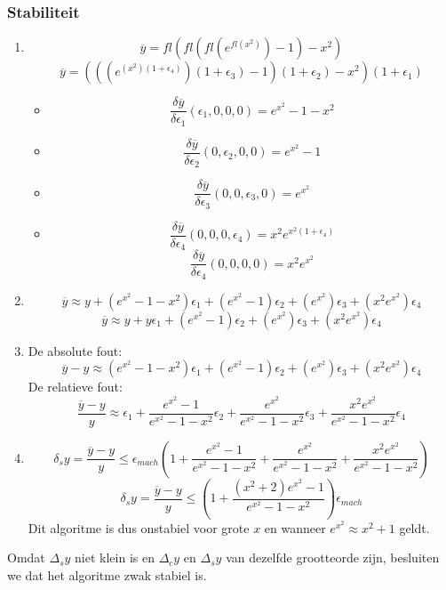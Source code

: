\documentclass[examenvragen.tex]{subfiles}
\begin{document}
\subsubsection{Stabiliteit}
\begin{enumerate}
\item
\[
\overline{y} =  fl\left(fl\left(fl\left(e^{fl\left(x^{2}\right)}\right)-1\right)-x^{2}\right)
\]
\[
\overline{y} =  \left(\left(\left(e^{\left(x^{2}\right)(1+\epsilon_4)}\right)(1+\epsilon_3)-1\right)(1+\epsilon_2)-x^{2}\right)(1+\epsilon_1)
\]

\begin{itemize}
\item 
\[
\frac{\delta\overline{y}}{\delta\epsilon_1}(\epsilon_1,0,0,0) = e^{x^{2}}-1-x^{2}
\]
\item 
\[
\frac{\delta\overline{y}}{\delta\epsilon_2}(0,\epsilon_2,0,0) = e^{x^{2}}-1
\]
\item 
\[
\frac{\delta\overline{y}}{\delta\epsilon_3}(0,0,\epsilon_3,0) = e^{x^{2}}
\]
\item 
\[
\frac{\delta\overline{y}}{\delta\epsilon_4}(0,0,0,\epsilon_4) = x^{2}e^{x^{2}(1+\epsilon_4)}
\]
\[
\frac{\delta\overline{y}}{\delta\epsilon_4}(0,0,0,0) = x^{2}e^{x^{2}}
\]
\end{itemize}
\item
\[
\overline{y} \approx y
+ \left(e^{x^{2}}-1-x^{2}\right)\epsilon_1
+ \left(e^{x^{2}}-1\right)\epsilon_2
+ \left(e^{x^{2}}\right)\epsilon_3
+ \left(x^{2}e^{x^{2}}\right)\epsilon_4
\]
\[
\overline{y} \approx y
+ y\epsilon_1
+ \left(e^{x^{2}}-1\right)\epsilon_2
+ \left(e^{x^{2}}\right)\epsilon_3
+ \left(x^{2}e^{x^{2}}\right)\epsilon_4
\]
\item
De absolute fout:
\[
\overline{y} - y \approx
  \left(e^{x^{2}}-1-x^{2}\right)\epsilon_1
+ \left(e^{x^{2}}-1\right)\epsilon_2
+ \left(e^{x^{2}}\right)\epsilon_3
+ \left(x^{2}e^{x^{2}}\right)\epsilon_4
\]
De relatieve fout:
\[
\frac{\overline{y}-y}{y} \approx 
 \epsilon_1
+ \frac{e^{x^{2}}-1}{e^{x^{2}}-1-x^{2}}\epsilon_2
+ \frac{e^{x^{2}}}{e^{x^{2}}-1-x^{2}}\epsilon_3
+ \frac{x^{2}e^{x^{2}}}{e^{x^{2}}-1-x^{2}}\epsilon_4
\]
\item
\[
\delta_sy=
\frac{\overline{y}-y}{y} \le
 \epsilon_{mach}
 \left(
 1
 + \frac{e^{x^{2}}-1}{e^{x^{2}}-1-x^{2}}
 + \frac{e^{x^{2}}}{e^{x^{2}}-1-x^{2}}
 +\frac{x^{2}e^{x^{2}}}{e^{x^{2}}-1-x^{2}}
 \right)
\]
\[
\delta_sy=
\frac{\overline{y}-y}{y} \le
 \left(
 1
 + \frac{(x^2+2)e^{x^{2}}-1}{e^{x^{2}}-1-x^{2}}
 \right)
  \epsilon_{mach}
\]
Dit algoritme is dus onstabiel voor grote $x$ en wanneer $e^{x^{2}}\approx x^2+1$ geldt.
\end{enumerate}
Omdat $\Delta_sy$ niet klein is en $\Delta_cy$ en $\Delta_sy$ van dezelfde grootteorde zijn, besluiten we dat het algoritme zwak stabiel is.
\end{document}
